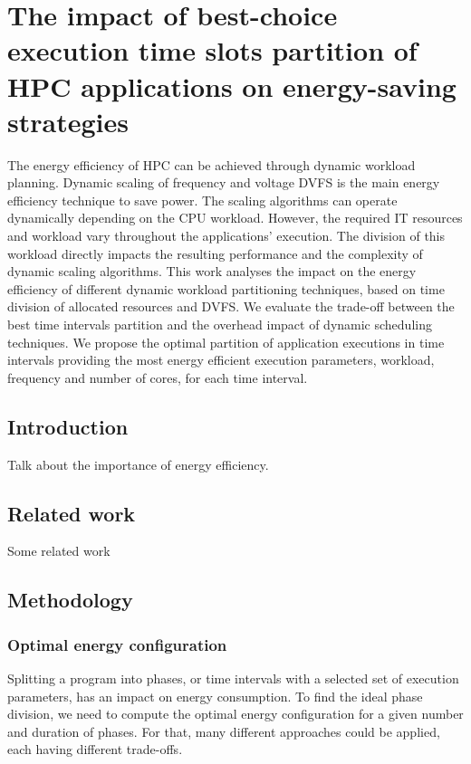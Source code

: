 
\section{The impact of best-choice execution time slots partition of HPC applications on energy-saving strategies}

The energy efficiency of HPC can be achieved through dynamic workload planning. Dynamic scaling of frequency and voltage DVFS is the main energy efficiency technique to save power. The scaling algorithms can operate dynamically depending on the CPU workload. However, the required IT resources and workload vary throughout the applications' execution. The division of this workload directly impacts the resulting performance and the complexity of dynamic scaling algorithms. This work analyses the impact on the energy efficiency of different dynamic workload partitioning techniques, based on time division of allocated resources and DVFS. We evaluate the trade-off between the best time intervals partition and the overhead impact of dynamic scheduling techniques. We propose the optimal partition of application executions in time intervals providing the most energy efficient execution parameters, workload, frequency and number of cores, for each time interval.

\subsection{Introduction}
Talk about the importance of energy efficiency.

\subsection{Related work}
Some related work

\subsection{Methodology}

\subsubsection{Optimal energy configuration}
Splitting a program into phases, or time intervals with a selected set of execution parameters, has an impact on energy consumption. To find the ideal phase division, we need to compute the optimal energy configuration for a given number and duration of phases. For that, many different approaches could be applied, each having different trade-offs. 

